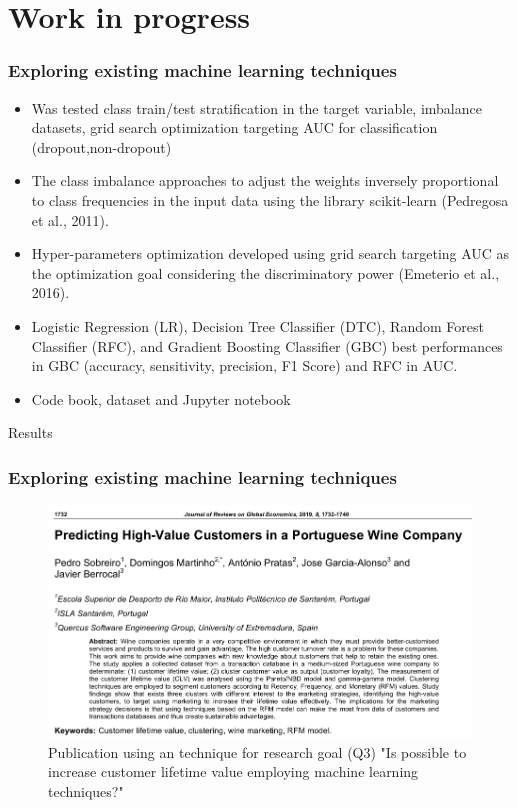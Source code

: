 \documentclass[10pt]{beamer}
\begin{document}
\section{Work in progress}
\begin{frame}
	\frametitle{Exploring existing machine learning techniques}
	\begin{itemize}
		\item Was tested class train/test stratification in the target variable, imbalance datasets, grid search optimization targeting AUC for classification (dropout,non-dropout)
		\item The class imbalance approaches to adjust the weights inversely proportional to class frequencies in the input data using the library scikit-learn (Pedregosa et al., 2011). 
		\item Hyper-parameters optimization developed using grid search targeting AUC as the optimization goal considering the discriminatory power (Emeterio et al., 2016). 
		\item Logistic Regression (LR), Decision Tree Classifier (DTC), Random Forest Classifier (RFC), and Gradient Boosting Classifier (GBC) best performances in GBC (accuracy, sensitivity, precision, F1 Score) and RFC in AUC.
		\item Code book, dataset and Jupyter notebook \href{https://github.com/pesobreiro/dropoutPredFitness}{\color{red}{code}}
	\end{itemize}
\end{frame}

\begin{frame}[fragile]{Results}
	\frametitle{Exploring existing machine learning techniques}
	\begin{figure}
		\includegraphics[scale=0.4]{../img/pub1.png}
		\caption{Publication using an technique for research goal (Q3) "Is possible to increase customer lifetime value employing machine learning techniques?"}
		\label{figure3}
	\end{figure}
\end{frame}
\end{document}
